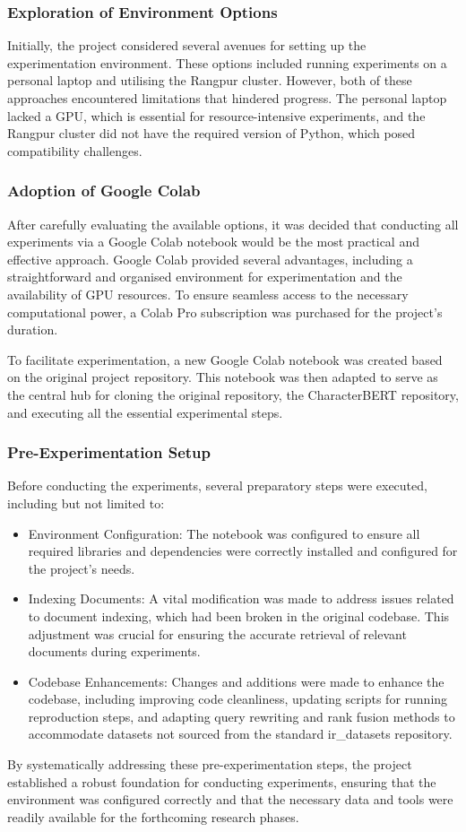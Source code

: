 \subsubsection{Exploration of Environment Options}
Initially, the project considered several avenues for setting up the experimentation environment. These options included running experiments on a personal laptop and utilising the Rangpur cluster. However, both of these approaches encountered limitations that hindered progress. The personal laptop lacked a GPU, which is essential for resource-intensive experiments, and the Rangpur cluster did not have the required version of Python, which posed compatibility challenges.

\subsubsection{Adoption of Google Colab}
After carefully evaluating the available options, it was decided that conducting all experiments via a Google Colab notebook would be the most practical and effective approach. Google Colab provided several advantages, including a straightforward and organised environment for experimentation and the availability of GPU resources. To ensure seamless access to the necessary computational power, a Colab Pro subscription was purchased for the project's duration.

To facilitate experimentation, a new Google Colab notebook was created based on the original project repository. This notebook was then adapted to serve as the central hub for cloning the original repository, the CharacterBERT repository, and executing all the essential experimental steps.

\subsubsection{Pre-Experimentation Setup}
Before conducting the experiments, several preparatory steps were executed, including but not limited to:

\begin{itemize}
    \item Environment Configuration: The notebook was configured to ensure all required libraries and dependencies were correctly installed and configured for the project's needs.
    \item Indexing Documents: A vital modification was made to address issues related to document indexing, which had been broken in the original codebase. This adjustment was crucial for ensuring the accurate retrieval of relevant documents during experiments.
    \item Codebase Enhancements: Changes and additions were made to enhance the codebase, including improving code cleanliness, updating scripts for running reproduction steps, and adapting query rewriting and rank fusion methods to accommodate datasets not sourced from the standard ir\_datasets repository.
\end{itemize}

By systematically addressing these pre-experimentation steps, the project established a robust foundation for conducting experiments, ensuring that the environment was configured correctly and that the necessary data and tools were readily available for the forthcoming research phases.
